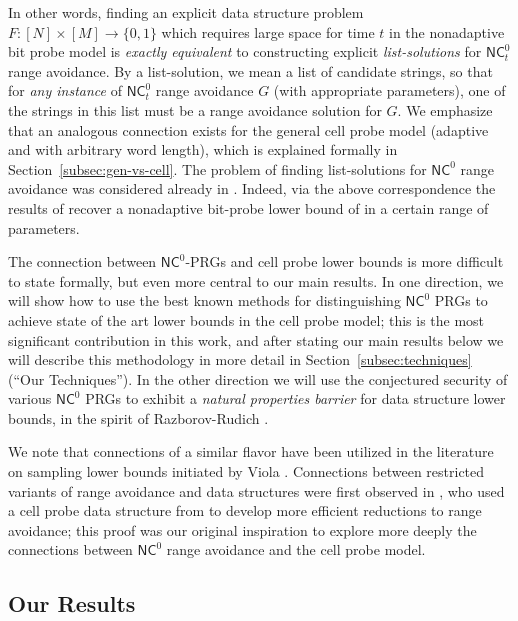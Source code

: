 \documentclass[11pt]{article}
\newcommand{\B}{\{0,1\}}
\newcommand{\N}{[N]}
\begin{document}
In other words, finding an explicit data structure problem $F:\N \times [M] \to \B$ which requires large space for time $t$ in the nonadaptive bit probe model is \emph{exactly equivalent} to constructing explicit \emph{list-solutions} for $\mathsf{NC}^0_t$ range avoidance. By a list-solution, we mean a list of candidate strings, so that for \emph{any instance} of $\mathsf{NC}^0_t$ range avoidance $G$ (with appropriate parameters), one of the strings in this list must be a range avoidance solution for $G$. 
We emphasize that an analogous connection exists for the general cell probe model (adaptive and with arbitrary word length), which is explained formally in Section~\ref{subsec:gen-vs-cell}.
The problem of finding list-solutions for $\mathsf{NC}^0$ range avoidance was considered already in \cite{guruswami2022range}. Indeed, via the above correspondence the results of \cite{guruswami2022range} recover a nonadaptive bit-probe lower bound of \cite{golovnev} in a certain range of parameters.

The connection between $\mathsf{NC}^0$-PRGs and cell probe lower bounds is more difficult to state formally, but even more central to our main results. In one direction, we will show how to use the best known methods for distinguishing $\mathsf{NC}^0$ PRGs to achieve state of the art lower bounds in the cell probe model; this is the most significant contribution in this work, and after stating our main results below we will describe this methodology in more detail in Section~\ref{subsec:techniques} (``Our Techniques'').
In the other direction we will use the conjectured security of various $\mathsf{NC}^0$ PRGs to exhibit a \emph{natural properties barrier} for data structure lower bounds, in the spirit of Razborov-Rudich \cite{natural-proofs}.

We note that connections of a similar flavor have been utilized in the literature on sampling lower bounds initiated by Viola \cite{viola-sampling}. Connections between restricted variants of range avoidance and data structures were first observed in \cite{guruswami2022range}, who used a cell probe data structure from \cite{succincter} to develop more efficient reductions to range avoidance; this proof was our original inspiration to explore more deeply the connections between $\mathsf{NC}^0$ range avoidance and the cell probe model.

\subsection{Our Results}
\end{document}
